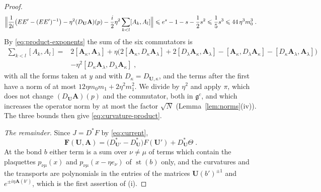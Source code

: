 \documentclass[11pt]{preprint}
\numberwithin{equation}{section}
\begin{document}
\begin{proof}
\[
    \Bigl\lVert\frac{1}{2i}\bigl(EE' - (EE')^{-1}\bigr) - \eta^2(D_{\mathbf U}\mathbf A)(p) - \frac{i}{2}\eta^2\sum_{k<l}[A_k, A_l]\Bigr\rVert \leqslant e^s - 1 - s - \frac{1}{2}s^2 \leqslant \frac{1}{5}s^3 \leqslant 44\,\eta^3m_0^3\;.
\]
By \eqref{eq:product-exponents} the sum of the six commutators is
\begin{align*}
    \sum_{k<l}[A_k, A_l] ={}& 2[\mathbf A_\kappa, \mathbf A_\lambda] + \eta\bigl(2[\mathbf A_\kappa, D_\kappa\mathbf A_\lambda] + 2[D_\lambda\mathbf A_\kappa, \mathbf A_\lambda] - [\mathbf A_\kappa, D_\lambda\mathbf A_\kappa] - [D_\kappa\mathbf A_\lambda, \mathbf A_\lambda]\bigr)\\
    &- \eta^2[D_\kappa\mathbf A_\lambda, D_\lambda\mathbf A_\kappa]\;,
\end{align*}
with all the forms taken at $y$ and with $D_\kappa = D_{\mathbf U,\kappa}$, and the terms after the first have a norm of at most $12\eta m_0m_1 + 2\eta^2m_1^2$. We divide by $\eta^2$ and apply $\pi$, which does not change $(D_{\mathbf U}\mathbf A)(p)$ and the commutator, both in $\mathfrak g^c$, and which increases the operator norm by at most the factor $\sqrt N$ (Lemma~\ref{lem:norms}(iv)). The three bounds then give \eqref{eq:curvature-product}.

\emph{The remainder.} Since $J = D^*F$ by \eqref{eq:current},
\begin{equation}\label{eq:current-remainder-form}
    \mathbf F(\mathbf U, \mathbf A) = \bigl(D^*_{\mathbf U'} - D^*_{\mathbf U}\bigr)F(\mathbf U') + D^*_{\mathbf U}\Theta\;.
\end{equation}
At the bond $b$ either term is a sum over $\nu \neq \mu$ of terms which contain the plaquettes $p_{\nu\mu}(x)$ and $p_{\nu\mu}(x - \eta e_\nu)$ of $\operatorname{st}(b)$ only, and the curvatures and the transports are polynomials in the entries of the matrices $\mathbf U(b')^{\pm1}$ and $e^{\pm i\eta\mathbf A(b')}$, which is the first assertion of (i).


\end{proof}
\end{document}
